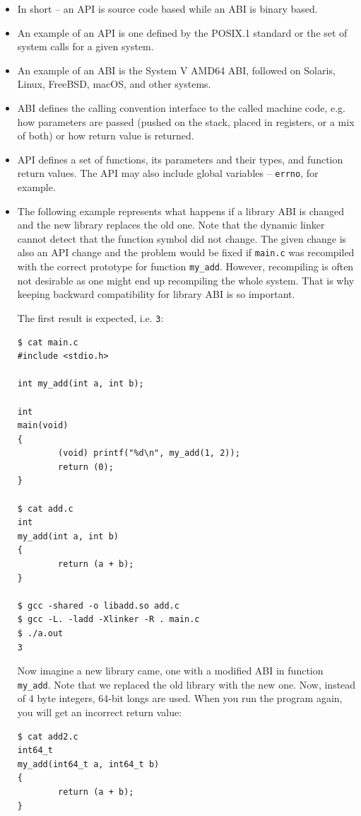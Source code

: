 \begin{itemize}
\item In short -- an API is source code based while an ABI is binary based.
\item An example of an API is one defined by the POSIX.1 standard or the set of
system calls for a given system.
\item An example of an ABI is the System V AMD64 ABI, followed on Solaris,
Linux, FreeBSD, macOS, and other systems.
\item ABI defines the calling convention interface to the called machine code, e.g.
how parameters are passed (pushed on the stack, placed in registers, or a mix
of both) or how return value is returned.
\item API defines a set of functions, its parameters and their types, and
function return values.  The API may also include global variables --
\texttt{errno}, for example.
\item The following example represents what happens if a library ABI is changed
and the new library replaces the old one.  Note that the dynamic linker cannot
detect that the function symbol did not change.  The given change is also an
API change and the problem would be fixed if \texttt{main.c} was recompiled
with the correct prototype for function \texttt{my\_add}.  However,
recompiling is often not desirable as one might end up recompiling the whole
system.  That is why keeping backward compatibility for library ABI is so
important.

The first result is expected, i.e. \texttt{3}:

\begin{verbatim}
$ cat main.c
#include <stdio.h>

int my_add(int a, int b);

int
main(void)
{
        (void) printf("%d\n", my_add(1, 2));
        return (0);
}

$ cat add.c
int
my_add(int a, int b)
{
        return (a + b);
}

$ gcc -shared -o libadd.so add.c
$ gcc -L. -ladd -Xlinker -R . main.c
$ ./a.out
3
\end{verbatim}

Now imagine a new library came, one with a modified ABI in function
\texttt{my\_add}.  Note that we replaced the old library with the new one.
Now, instead of 4 byte integers, 64-bit longs are used.  When you run the
program again, you will get an incorrect return value:

\begin{verbatim}
$ cat add2.c
int64_t
my_add(int64_t a, int64_t b)
{
        return (a + b);
}


\end{verbatim}
\end{itemize}
